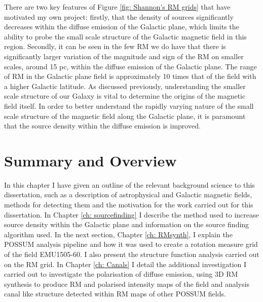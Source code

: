 There are two key features of Figure \ref{fig: Shannon's RM grids} that have motivated my own project: firstly, that the density of sources significantly decreases within the diffuse emission of the Galactic plane, which limits the ability to probe the small scale structure of the Galactic magnetic field in this region. Secondly, it can be seen in the few RM we do have that there is significantly larger variation of the magnitude and sign of the RM on smaller scales, around 15 pc, within the diffuse emission of the Galactic plane. The range of RM in the Galactic plane field is approximately 10 times that of the field with a higher Galactic latitude. As discussed previously, understanding the smaller scale structure of our Galaxy is vital to determine the origins of the magnetic field itself. In order to better understand the rapidly varying nature of the small scale structure of the magnetic field along the Galactic plane, it is paramount that the source density within the diffuse emission is improved.



\section{Summary and Overview}

In this chapter I have given an outline of the relevant background science to this dissertation, such as a description of astrophysical and Galactic magnetic fields, methods for detecting them and the motivation for the work carried out for this dissertation. In Chapter \ref{ch: sourcefinding} I describe the method used to increase source density within the Galactic plane and information on the source finding algorithm used. In the next section, Chapter \ref{ch: RMsynth}, I explain the POSSUM analysis pipeline and how it was used to create a rotation measure grid of the field EMU1505-60. I also present the structure function analysis carried out on the RM grid. In Chapter \ref{ch: Canals} I detail the additional investigation I carried out to investigate the polarisation of diffuse emission, using 3D RM synthesis to produce RM and polarised intensity maps of the field and analysis canal like structure detected within RM maps of other POSSUM fields.

